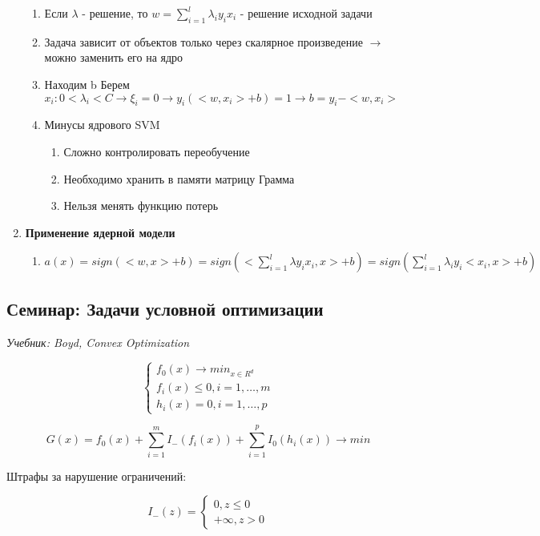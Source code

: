 \documentclass[a4paper, 12pt]{article}
\begin{document}
\begin{enumerate}
\begin{enumerate}
        \item Если $\lambda$ - решение, то $w = \sum_{i = 1}^l \lambda_i y_i x_i$ - решение исходной задачи
        \item Задача зависит от объектов только через скалярное произведение $\rightarrow$
        можно заменить его на ядро
        \item Находим b
        Берем $x_i: 0 < \lambda_i < C \rightarrow \xi_i = 0 \rightarrow y_i(<w, x_i> + b) = 1 \rightarrow b = y_i - <w, x_i>$
        \item Минусы ядрового SVM
        \begin{enumerate}
            \item Сложно контролировать переобучение
            \item Необходимо хранить в памяти матрицу Грамма
            \item Нельзя менять функцию потерь
        \end{enumerate}
    \end{enumerate}
    \item \textbf{Применение ядерной модели}
    \begin{enumerate}
        \item $a(x) = sign(<w, x> + b) = sign(<\sum_{i = 1}^l \lambda y_i x_i, x> + b) = sign(\sum_{i = 1}^l \lambda_i y_i <x_i, x> + b)$ 
    \end{enumerate}
\end{enumerate}

\subsection{Семинар: Задачи условной оптимизации}

\textit{Учебник: Boyd, Convex Optimization}

\[\begin{cases}
    f_0(x) \rightarrow min_{x \in R^d} \\
    f_i(x) \leq 0, i = 1, \ldots, m \\
    h_i(x) = 0, i = 1, \ldots, p
\end{cases}\]

\[G(x) = f_0(x) + \sum_{i = 1}^m I_{-}(f_i(x)) + \sum_{i = 1}^p I_0(h_i(x)) \rightarrow min\]

Штрафы за нарушение ограничений:

\[I_{-}(z) = \begin{cases}
    0, z \leq 0 \\
    + \infty, z > 0 
\end{cases}\]
\end{document}
